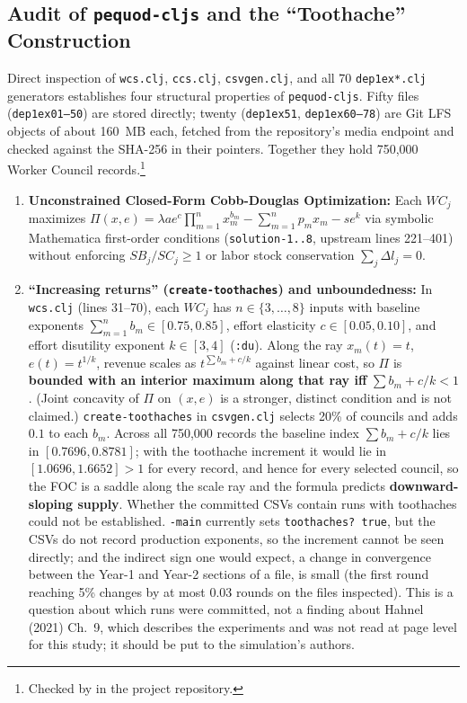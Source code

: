 \documentclass[10pt,twoside,openany]{book}
\theoremstyle{dpepstyle}
\begin{document}
\subsection{Audit of \texttt{pequod-cljs} and the ``Toothache'' Construction}
Direct inspection of \texttt{wcs.clj}, \texttt{ccs.clj}, \texttt{csvgen.clj}, and all 70 \texttt{dep1ex*.clj} generators establishes four structural properties of \texttt{pequod-cljs}. Fifty files (\texttt{dep1ex01--50}) are stored directly; twenty (\texttt{dep1ex51}, \texttt{dep1ex60--78}) are Git LFS objects of about 160~MB each, fetched from the repository's media endpoint and checked against the SHA-256 in their pointers. Together they hold 750,000 Worker Council records.\footnote{Checked by  in the project repository.}
\begin{enumerate}[leftmargin=1.8em,itemsep=2pt]
  \item \textbf{Unconstrained Closed-Form Cobb-Douglas Optimization:} Each $WC_j$ maximizes $\Pi(x,e) = \lambda a e^c \prod_{m=1}^n x_m^{b_m} - \sum_{m=1}^n p_m x_m - s e^k$ via symbolic Mathematica first-order conditions (\texttt{solution-1..8}, upstream lines 221--401) without enforcing $SB_j / SC_j \ge 1$ or labor stock conservation $\sum_j \Delta l_j = 0$.
  \item \textbf{``Increasing returns'' (\texttt{create-toothaches}) and unboundedness:} In \texttt{wcs.clj} (lines 31--70), each $WC_j$ has $n \in \{3, \dots, 8\}$ inputs with baseline exponents $\sum_{m=1}^n b_m \in [0.75, 0.85]$, effort elasticity $c \in [0.05, 0.10]$, and effort disutility exponent $k \in [3, 4]$ (\texttt{:du}). Along the ray $x_m(t)=t$, $e(t)=t^{1/k}$, revenue scales as $t^{\sum b_m + c/k}$ against linear cost, so $\Pi$ is \textbf{bounded with an interior maximum along that ray iff} $\sum b_m + c/k < 1$. (Joint concavity of $\Pi$ on $(x,e)$ is a stronger, distinct condition and is not claimed.) \texttt{create-toothaches} in \texttt{csvgen.clj} selects 20\% of councils and adds $0.1$ to each $b_m$. Across all 750,000 records the baseline index $\sum b_m + c/k$ lies in $[0.7696, 0.8781]$; with the toothache increment it would lie in $[1.0696, 1.6652] > 1$ for every record, and hence for every selected council, so the FOC is a saddle along the scale ray and the formula predicts \textbf{downward-sloping supply}. Whether the committed CSVs contain runs with toothaches could not be established. \texttt{-main} currently sets \texttt{toothaches? true}, but the CSVs do not record production exponents, so the increment cannot be seen directly; and the indirect sign one would expect, a change in convergence between the Year-1 and Year-2 sections of a file, is small (the first round reaching 5\% changes by at most 0.03 rounds on the files inspected). This is a question about which runs were committed, not a finding about Hahnel (2021) Ch.~9, which describes the experiments and was not read at page level for this study; it should be put to the simulation's authors.

\end{enumerate}
\end{document}
